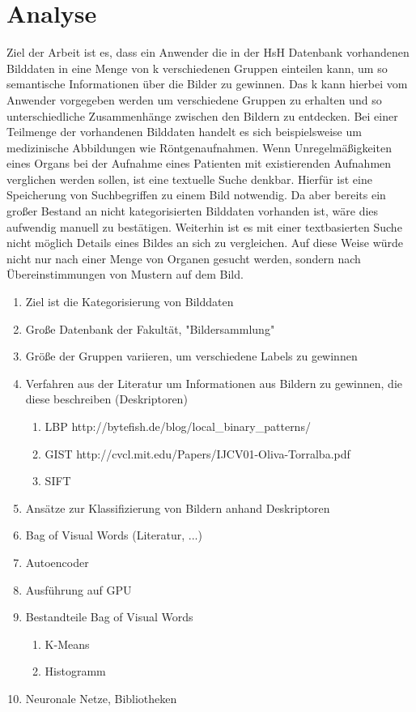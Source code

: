 \chapter{Analyse}

Ziel der Arbeit ist es, dass ein Anwender die in der HsH Datenbank vorhandenen Bilddaten in eine Menge von k verschiedenen Gruppen einteilen kann, um so semantische Informationen über die Bilder zu gewinnen. Das k kann hierbei vom Anwender vorgegeben werden um verschiedene Gruppen zu erhalten und so unterschiedliche Zusammenhänge zwischen den Bildern zu entdecken. Bei einer Teilmenge der vorhandenen Bilddaten handelt es sich beispielsweise um medizinische Abbildungen wie Röntgenaufnahmen. Wenn Unregelmäßigkeiten eines Organs bei der Aufnahme eines Patienten mit existierenden Aufnahmen verglichen werden sollen, ist eine textuelle Suche denkbar. Hierfür ist eine Speicherung von Suchbegriffen zu einem Bild notwendig. Da aber bereits ein großer Bestand an nicht kategorisierten Bilddaten vorhanden ist, wäre dies aufwendig manuell zu bestätigen. Weiterhin ist es mit einer textbasierten Suche nicht möglich Details eines Bildes an sich zu vergleichen. Auf diese Weise würde nicht nur nach einer Menge von Organen gesucht werden, sondern nach Übereinstimmungen von Mustern auf dem Bild.

\begin{enumerate}
	\item Ziel ist die Kategorisierung von Bilddaten
	\item Große Datenbank der Fakultät, "Bildersammlung"
	\item Größe der Gruppen variieren, um verschiedene Labels zu gewinnen
	\item Verfahren aus der Literatur um Informationen aus Bildern zu gewinnen, die diese beschreiben (Deskriptoren) \begin{enumerate}
		\item LBP http://bytefish.de/blog/local\_binary\_patterns/
		\item GIST http://cvcl.mit.edu/Papers/IJCV01-Oliva-Torralba.pdf
		\item SIFT 
	\end{enumerate}
	\item Ansätze zur Klassifizierung von Bildern anhand Deskriptoren
		\item Bag of Visual Words (Literatur, ...)
		\item Autoencoder
	\item Ausführung auf GPU
		\item Bestandteile Bag of Visual Words \begin{enumerate}
			\item K-Means
			\item Histogramm
		\end{enumerate}
		\item Neuronale Netze, Bibliotheken 
\end{enumerate}

